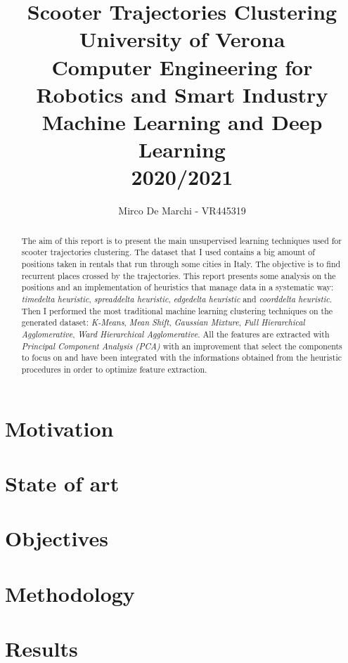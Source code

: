 \documentclass[]{IEEEtran}
\title{Scooter Trajectories Clustering\\
	{\large University of Verona\\Computer Engineering for Robotics and Smart Industry\\Machine Learning and Deep Learning\\2020/2021\\}}
\author{Mirco De Marchi - VR445319}
\begin{document}
\maketitle

\begin{abstract}
	The aim of this report is to present the main unsupervised learning techniques used for scooter trajectories clustering. The dataset that I used contains a big amount of positions taken in rentals that run through some cities in Italy. The objective is to find recurrent places crossed by the trajectories. This report presents some analysis on the positions and an implementation of heuristics that manage data in a systematic way: \textit{timedelta heuristic}, \textit{spreaddelta heuristic}, \textit{edgedelta heuristic} and \textit{coorddelta heuristic}. Then I performed the most traditional machine learning clustering techniques on the generated dataset: \textit{K-Means}, \textit{Mean Shift}, \textit{Gaussian Mixture}, \textit{Full Hierarchical Agglomerative}, \textit{Ward Hierarchical Agglomerative}. All the features are extracted with \textit{Principal Component Analysis (PCA)} with an improvement that select the components to focus on and have been integrated with the informations obtained from the heuristic procedures in order to optimize feature extraction.
\end{abstract}

\section{Motivation}


\section{State of art}


\section{Objectives}


\section{Methodology}


\section{Results}

\end{document}
